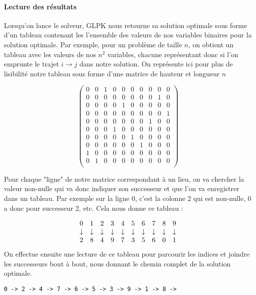\documentclass[a4paper,12pt]{article}
\begin{document}
\paragraph{Lecture des résultats}{
    Lorsqu'on lance le solveur, GLPK nous retourne sa solution optimale sous forme d'un tableau contenant les l'ensemble des valeurs de nos variables binaires pour la solution optimale. Par exemple, pour un problème de taille $n$, on obtient un tableau avec les valeurs de nos $n^2$ variables, chacune représentant donc si l'on emprunte le trajet $i \rightarrow j$ dans notre solution. On représente ici pour plus de lisibilité notre tableau sous forme d'une matrice de hauteur et longueur $n$
    
\[
\begin{pmatrix}
   0 & 0 & 1 & 0 & 0 & 0 & 0 & 0 & 0 & 0  \\
   0 & 0 & 0 & 0 & 0 & 0 & 0 & 0 & 1 & 0  \\
   0 & 0 & 0 & 0 & 1 & 0 & 0 & 0 & 0 & 0  \\
   0 & 0 & 0 & 0 & 0 & 0 & 0 & 0 & 0 & 1  \\
   0 & 0 & 0 & 0 & 0 & 0 & 0 & 1 & 0 & 0  \\
   0 & 0 & 0 & 1 & 0 & 0 & 0 & 0 & 0 & 0  \\
   0 & 0 & 0 & 0 & 0 & 1 & 0 & 0 & 0 & 0  \\
   0 & 0 & 0 & 0 & 0 & 0 & 1 & 0 & 0 & 0  \\
   1 & 0 & 0 & 0 & 0 & 0 & 0 & 0 & 0 & 0  \\
   0 & 1 & 0 & 0 & 0 & 0 & 0 & 0 & 0 & 0  \\
\end{pmatrix}
\]
    
    Pour chaque "ligne" de notre matrice correspondant à un lieu, on va chercher la valeur non-nulle qui va donc indiquer son successeur et que l'on va enregistrer dans un tableau. Par exemple sur la ligne 0, c'est la colonne 2 qui est non-nulle, 0 a donc pour successeur 2, etc. Cela nous donne ce tableau :
    
\[
\begin{array}{c c c c c c c c c c}
    0 & 1 & 2 & 3 & 4 & 5 & 6 & 7 & 8 & 9 \\
    \downarrow & \downarrow & \downarrow & \downarrow & \downarrow & \downarrow & \downarrow & \downarrow & \downarrow & \downarrow \\
    2 & 8 & 4 & 9 & 7 & 3 & 5 & 6 & 0 & 1 \\
\end{array}
\]
    On effectue ensuite une lecture de ce tableau pour parcourir les indices et joindre les successeurs bout à bout, nous donnant le chemin complet de la solution optimale.
    
\begin{verbatim}
0 -> 2 -> 4 -> 7 -> 6 -> 5 -> 3 -> 9 -> 1 -> 8 -> 
\end{verbatim}
}
\end{document}
